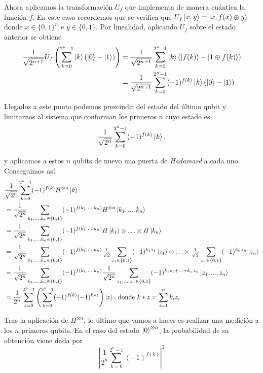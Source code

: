 Ahora aplicamos la transformación $U_f$ que implementa de manera cuántica la función $f$. En este caso recordemos que se verifica que $U_f\left|x,y\right\rangle=\left|x,f(x)\oplus y\right\rangle$ donde $x\in\{0,1\}^n$ e $y\in\{0,1\}$. Por linealidad, aplicando $U_f$ sobre el estado anterior se obtiene
\[
\begin{split}
\dfrac{1}{\sqrt{2^{n+1}}}U_f\left(\sum_{k=0}^{2^n-1}\left|k\right\rangle(\left|0\right\rangle -\left|1\right\rangle)\right)&=\dfrac{1}{\sqrt{2^{n+1}}}\sum_{k=0}^{2^n-1}\left|k\right\rangle(\left|f(k)\right\rangle -\left|1\oplus f(k)\right\rangle)\\
&=\dfrac{1}{\sqrt{2^{n+1}}}\sum_{k=0}^{2^n-1}(-1)^{f(k)}\left|k\right\rangle(\left|0\right\rangle -\left|1\right\rangle)\\
\end{split}
\]

Llegados a este punto podemos prescindir del estado del último qubit y limitarnos al sistema que conforman los primeros $n$ cuyo estado es
\[\dfrac{1}{\sqrt{2^n}}\sum_{k=0}^{2^n-1}(-1)^{f(k)}\left|k\right\rangle.\]

y aplicamos a estos $n$ qubits de nuevo una puerta de \textit{Hadamard} a cada uno. Conseguimos así:
\[
\begin{split}
&\dfrac{1}{\sqrt{2^n}}\sum_{k=0}^{2^n-1}(-1)^{f(k)}H^{\otimes n}\left|k\right\rangle\\
&=\dfrac{1}{\sqrt{2^n}}\sum_{k_1,...,k_n\in\{0,1\}}(-1)^{f(k_1,...,k_n)}H^{\otimes n}\left|k_1,...,k_n\right\rangle\\
&=\dfrac{1}{\sqrt{2^n}}\sum_{k_1,...,k_n\in\{0,1\}}(-1)^{f(k_1,...,k_n)}H\left|k_1\right\rangle\otimes\hdots\otimes H\left|k_n\right\rangle\\
&=\dfrac{1}{\sqrt{2^n}}\sum_{k_1,...,k_n\in\{0,1\}}(-1)^{f(k_1,...,k_n)}\tfrac{1}{\sqrt{2}}\sum_{z_1\in\{0,1\}}(-1)^{k_1z_1}\left|z_1\right\rangle\otimes\hdots\otimes \tfrac{1}{\sqrt{2}}\sum_{z_n\in\{0,1\}}(-1)^{k_nz_n}\left|z_n\right\rangle\\
&=\dfrac{1}{\sqrt{2^n}}\sum_{k_1,...,k_n\in\{0,1\}}(-1)^{f(k_1,...,k_n)}\dfrac{1}{\sqrt{2^n}}\sum_{z_1,...,z_n\in\{0,1\}}(-1)^{k_1z_1+\hdots+k_nz_n}\left|z_1,...,z_n\right\rangle\\
&=\dfrac{1}{2^n}\sum_{z=0}^{2^n-1}\left(\sum_{k=0}^{2^n-1}(-1)^{f(k)}(-1)^{k*z}\right)\left|z\right\rangle\textrm{, donde }k*z=\sum_{i=1}^nk_iz_i
\end{split}
\]

Tras la aplicación de $H^{\otimes n}$, lo último que vamos a hacer es realizar una medición a los $n$ primeros qubits. En el caso del estado $\left|0\right\rangle^{\otimes n}$, la probabilidad de su obtención viene dada por
\begin{equation}
\label{eq:eq61}
\left|\dfrac{1}{2^n}\sum_{k=0}^{2^n-1}(-1)^{f(k)}\right|^2
\end{equation}


